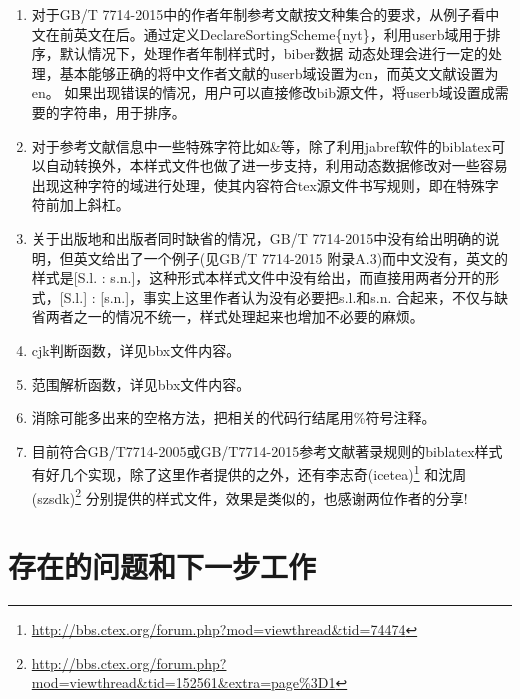 \begin{enumerate}
  \item 对于GB/T 7714-2015中的作者年制参考文献按文种集合的要求，从例子看中文在前英文在后。通过定义DeclareSortingScheme\{nyt\}，利用userb域用于排序，默认情况下，处理作者年制样式时，biber数据
动态处理会进行一定的处理，基本能够正确的将中文作者文献的userb域设置为cn，而英文文献设置为en。
如果出现错误的情况，用户可以直接修改bib源文件，将userb域设置成需要的字符串，用于排序。


\item 对于参考文献信息中一些特殊字符比如\&等，除了利用jabref软件的biblatex可以自动转换外，本样式文件也做了进一步支持，利用动态数据修改对一些容易出现这种字符的域进行处理，使其内容符合tex源文件书写规则，即在特殊字符前加上斜杠。

  \item 关于出版地和出版者同时缺省的情况，GB/T 7714-2015中没有给出明确的说明，但英文给出了一个例子(见GB/T 7714-2015 附录A.3)而中文没有，英文的样式是[S.l. : s.n.]，这种形式本样式文件中没有给出，而直接用两者分开的形式，[S.l.] : [s.n.]，事实上这里作者认为没有必要把s.l.和s.n. 合起来，不仅与缺省两者之一的情况不统一，样式处理起来也增加不必要的麻烦。

  \item cjk判断函数，详见bbx文件内容。

  \item 范围解析函数，详见bbx文件内容。

  \item 消除可能多出来的空格方法，把相关的代码行结尾用\%符号注释。

  \item 目前符合GB/T7714-2005或GB/T7714-2015参考文献著录规则的biblatex样式有好几个实现，除了这里作者提供的之外，还有李志奇(icetea)\footnote{\url{http://bbs.ctex.org/forum.php?mod=viewthread&tid=74474}} 和沈周(szsdk)\footnote{\url{http://bbs.ctex.org/forum.php?mod=viewthread&tid=152561&extra=page\%3D1}} 分别提供的样式文件，效果是类似的，也感谢两位作者的分享!

\end{enumerate}


\section{存在的问题和下一步工作}


